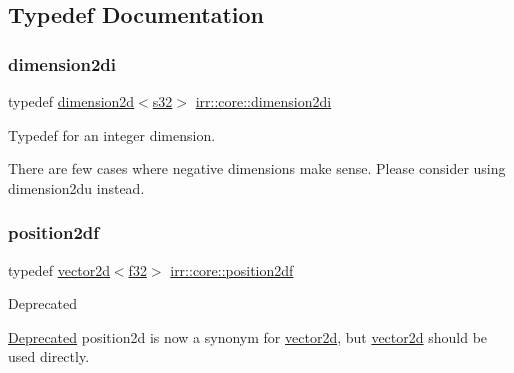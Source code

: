 \subsection{Typedef Documentation}
\mbox{\label{namespaceirr_1_1core_ac79bc3704cf28bc1ab72d7cd1cae78d1}} 
\subsubsection{\texorpdfstring{dimension2di}{dimension2di}}
{\footnotesize\ttfamily typedef \hyperlink{classirr_1_1core_1_1dimension2d}{dimension2d}$<$\hyperlink{namespaceirr_ac66849b7a6ed16e30ebede579f9b47c6}{s32}$>$ \hyperlink{namespaceirr_1_1core_ac79bc3704cf28bc1ab72d7cd1cae78d1}{irr\+::core\+::dimension2di}}



Typedef for an integer dimension. 

There are few cases where negative dimensions make sense. Please consider using dimension2du instead. \mbox{\label{namespaceirr_1_1core_ad9a4cf4ed6b9e8763ffd6656121fd32e}} 
\subsubsection{\texorpdfstring{position2df}{position2df}}
{\footnotesize\ttfamily typedef \hyperlink{classirr_1_1core_1_1vector2d}{vector2d}$<$\hyperlink{namespaceirr_a0277be98d67dc26ff93b1a6a1d086b07}{f32}$>$ \hyperlink{namespaceirr_1_1core_ad9a4cf4ed6b9e8763ffd6656121fd32e}{irr\+::core\+::position2df}}

\begin{DoxyRefDesc}{Deprecated}
\item[\hyperlink{deprecated__deprecated000025}{Deprecated}]position2d is now a synonym for \hyperlink{classirr_1_1core_1_1vector2d}{vector2d}, but \hyperlink{classirr_1_1core_1_1vector2d}{vector2d} should be used directly. \end{DoxyRefDesc}
\mbox{\label{namespaceirr_1_1core_a3643c2cc7820dd78cd87e73a46b92145}} 
